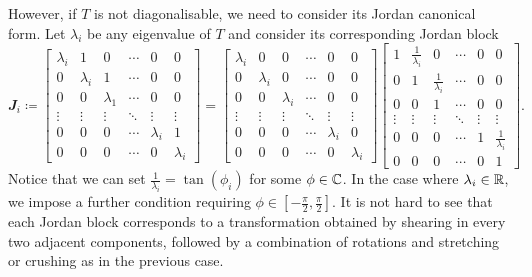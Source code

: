 \documentclass[math]{amznotes}
\theoremstyle{remark}
\begin{document}
However, if $T$ is not diagonalisable, we need to consider its Jordan canonical form. Let $\lambda_i$ be any eigenvalue of $T$ and consider its corresponding Jordan block
\begin{equation*}
    \mathbfit{J}_i \coloneqq \begin{bmatrix}
        \lambda_i & 1 & 0 & \cdots & 0 & 0 \\
        0 & \lambda_i & 1 & \cdots & 0 & 0 \\
        0 & 0 & \lambda_1 & \cdots & 0 & 0 \\
        \vdots & \vdots & \vdots & \ddots & \vdots & \vdots \\
        0 & 0 & 0 & \cdots & \lambda_i & 1 \\
        0 & 0 & 0 & \cdots & 0 & \lambda_i
    \end{bmatrix} = \begin{bmatrix}
        \lambda_i & 0 & 0 & \cdots & 0 & 0 \\
        0 & \lambda_i & 0 & \cdots & 0 & 0 \\
        0 & 0 & \lambda_i & \cdots & 0 & 0 \\
        \vdots & \vdots & \vdots & \ddots & \vdots & \vdots \\
        0 & 0 & 0 & \cdots & \lambda_i & 0 \\
        0 & 0 & 0 & \cdots & 0 & \lambda_i
    \end{bmatrix}\begin{bmatrix}
        1 & \frac{1}{\lambda_i} & 0 & \cdots & 0 & 0 \\
        0 & 1 & \frac{1}{\lambda_i} & \cdots & 0 & 0 \\
        0 & 0 & 1 & \cdots & 0 & 0 \\
        \vdots & \vdots & \vdots & \ddots & \vdots & \vdots \\
        0 & 0 & 0 & \cdots & 1 & \frac{1}{\lambda_i} \\
        0 & 0 & 0 & \cdots & 0 & 1
    \end{bmatrix}.
\end{equation*}
Notice that we can set $\frac{1}{\lambda_i} = \tan(\phi_i)$ for some $\phi \in \mathbb{C}$. In the case where $\lambda_i \in \mathbb{R}$, we impose a further condition requiring $\phi \in [-\frac{\pi}{2}, \frac{\pi}{2}]$. It is not hard to see that each Jordan block corresponds to a transformation obtained by shearing in every two adjacent components, followed by a combination of rotations and stretching or crushing as in the previous case.
\end{document}
